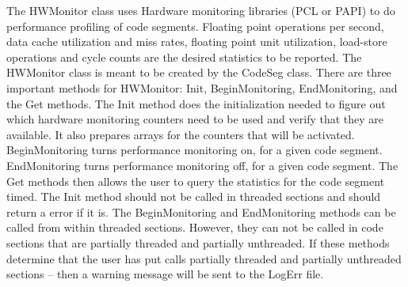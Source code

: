 %


The HWMonitor class uses Hardware monitoring libraries (PCL or PAPI)
to do performance profiling of code segments. Floating point operations
per second, data cache utilization and miss rates, floating point unit
utilization, load-store operations and cycle counts are the desired statistics to be reported.
The HWMonitor class is meant to be created by the CodeSeg
class. There are three important methods for HWMonitor: Init, BeginMonitoring,
EndMonitoring, and the Get methods. The Init method does the initialization needed
to figure out which hardware monitoring counters need to be used and verify
that they are available. It also prepares arrays for the counters that
will be activated. BeginMonitoring turns performance monitoring on, for
a given code segment. EndMonitoring turns performance monitoring off, for
a given code segment. The Get methods then allows the user to query the statistics
for the code segment timed. The Init method should not be
called in threaded sections and should return a error if it is. The BeginMonitoring
and EndMonitoring methods can be called from within threaded sections. However,
they can not be called in code sections that are partially threaded and
partially unthreaded. If these methods determine that the user has put calls
partially threaded and partially unthreaded sections -- then a warning message
will be sent to the LogErr file.

